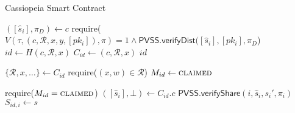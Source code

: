 \begin{algorithm}[h]
\caption{Cassiopeia Smart Contract}
\label{alg:cassiopeia_no_incentives}
    \begin{algorithmic}[1]
            
                \State $([\hat{s}_i], \pi_D) \gets c$
                \State require($V(\tau, (c, \mathcal{R}, x, y, [pk_i]), \pi) = 1 \land \textsf{PVSS.verifyDist}([\hat{s}_i], [pk_i], \pi_D$)
                \State $id \gets H(c, \mathcal{R}, x)$
                \State $C_{id} \gets (c, \mathcal{R}, x)$
                \State \Return $id$
            \EndFunction
            
                \State $\{\mathcal{R}, x, \dots\} \gets C_{id}$
                \State require($(x, w) \in \mathcal{R}$)
                \State $M_{id} \gets \textsc{claimed}$
            \EndFunction
            
                \State require($M_{id} = \textsc{claimed}$)
                \State $([\hat{s}_i], \bot) \gets C_{id}.c$
                \State $\textsf{PVSS.verifyShare}(i, \hat{s}_i, s_i', \pi_i)$
                \State $S_{id,i} \gets s$
            \EndFunction
        \EndContract
    \end{algorithmic}
\end{algorithm}

